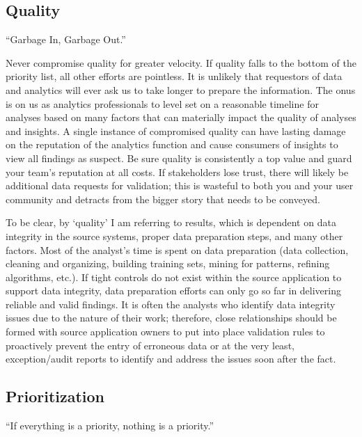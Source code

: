 \documentclass[
]{book}
\begin{document}
\hypertarget{quality}{%
\subsection{Quality}\label{quality}}

``Garbage In, Garbage Out.''

Never compromise quality for greater velocity. If quality falls to the bottom of the priority list, all other efforts are pointless. It is unlikely that requestors of data and analytics will ever ask us to take longer to prepare the information. The onus is on us as analytics professionals to level set on a reasonable timeline for analyses based on many factors that can materially impact the quality of analyses and insights. A single instance of compromised quality can have lasting damage on the reputation of the analytics function and cause consumers of insights to view all findings as suspect. Be sure quality is consistently a top value and guard your team's reputation at all costs. If stakeholders lose trust, there will likely be additional data requests for validation; this is wasteful to both you and your user community and detracts from the bigger story that needs to be conveyed.

To be clear, by `quality' I am referring to results, which is dependent on data integrity in the source systems, proper data preparation steps, and many other factors. Most of the analyst's time is spent on data preparation (data collection, cleaning and organizing, building training sets, mining for patterns, refining algorithms, etc.). If tight controls do not exist within the source application to support data integrity, data preparation efforts can only go so far in delivering reliable and valid findings. It is often the analysts who identify data integrity issues due to the nature of their work; therefore, close relationships should be formed with source application owners to put into place validation rules to proactively prevent the entry of erroneous data or at the very least, exception/audit reports to identify and address the issues soon after the fact.

\hypertarget{prioritization}{%
\subsection{Prioritization}\label{prioritization}}

``If everything is a priority, nothing is a priority.''
\end{document}

